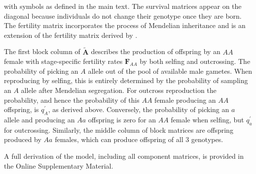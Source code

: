 \documentclass[11pt,draft]{article}
\def\mbf#1{\mathbf{#1}}
\begin{document}
\noindent with symbols as defined in the main text. The survival matrices appear on the diagonal because individuals do not change their genotype once they are born. The fertility matrix incorporates the process of Mendelian inheritance and is an extension of the fertility matrix derived by \citet{deVriesCaswell2019a}.

The first block column of $\tilde{\mbf{A}}$ describes the production of offspring by an $AA$ female with stage-specific fertility rates $\mbf{F}_{AA}$ by both selfing and outcrossing. The probability of picking an $A$ allele out of the pool of available male gametes. When reproducing by selfing, this is entirely determined by the probability of sampling an $A$ allele after Mendelian segregation. For outcross reproduction the probability, and hence the probability of this $AA$ female producing an $AA$ offspring, is $q^{\prime}_{A}$, as derived above. Conversely, the probability of picking an $a$ allele and producing an $Aa$ offspring is zero for an $AA$ female when selfing, but $q^{\prime}_a$ for outcrossing. Similarly, the middle column of block matrices are offspring produced by $Aa$ females, which can produce offspring of all $3$ genotypes.

A full derivation of the model, including all component matrices, is provided in the Online Supplementary Material. 
\end{document}
